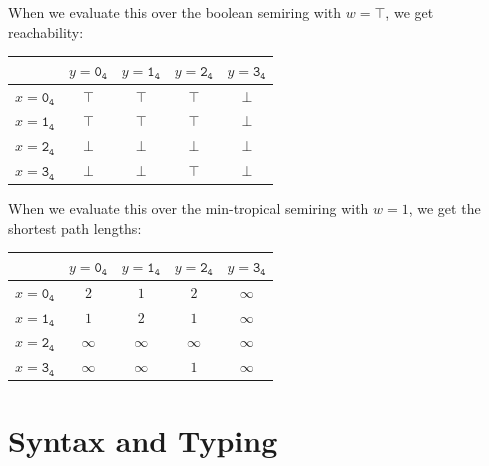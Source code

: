 \documentclass{report}
\theoremstyle{definition}
\begin{document}
When we evaluate this over the boolean semiring with \(w = \top\), we get reachability:
\begin{center}
	\begin{tabular}{l|cccc}
		& \(y = \mathtt{0_4}\) & \(y = \mathtt{1_4}\) & \(y = \mathtt{2_4}\) & \(y = \mathtt{3_4}\) \\
		\hline
		\(x = \mathtt{0_4}\) &\(\top\) & \(\top\) & \(\top\) & \(\bot\) \\
		\(x = \mathtt{1_4}\) &\(\top\) & \(\top\) & \(\top\) & \(\bot\) \\
		\(x = \mathtt{2_4}\) &\(\bot\) & \(\bot\) & \(\bot\) & \(\bot\) \\
		\(x = \mathtt{3_4}\) &\(\bot\) & \(\bot\) & \(\top\) & \(\bot\)
	\end{tabular}
\end{center}
When we evaluate this over the min-tropical semiring with \(w = 1\), we get the shortest path lengths:
\begin{center}
	\begin{tabular}{l|cccc}
		& \(y = \mathtt{0_4}\) & \(y = \mathtt{1_4}\) & \(y = \mathtt{2_4}\) & \(y = \mathtt{3_4}\) \\
		\hline
		\(x = \mathtt{0_4}\) &\(2\) & \(1\) & \(2\) & \(\infty\) \\
		\(x = \mathtt{1_4}\) &\(1\) & \(2\) & \(1\) & \(\infty\) \\
		\(x = \mathtt{2_4}\) &\(\infty\) & \(\infty\) & \(\infty\) & \(\infty\) \\
		\(x = \mathtt{3_4}\) &\(\infty\) & \(\infty\) & \(1\) & \(\infty\)
	\end{tabular}
\end{center}

\section{Syntax and Typing}
\end{document}
